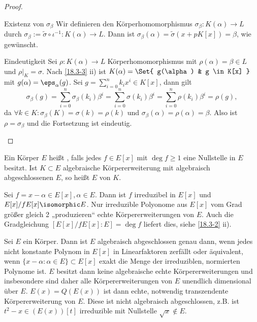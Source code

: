 \begin{st}
\begin{proof}
\begin{seg}{Existenz von $\sigma_\beta$}
			Wir definieren den Körperhomomorphismus $\sigma_\beta: K(\alpha) \to L$ durch $\sigma_\beta := \tilde \sigma \circ \iota^{-1}: K(\alpha) \to L$.
			Dann ist $\sigma_\beta(\alpha) = \tilde \sigma(x + pK[x]) = \beta$, wie gewünscht.
		\end{seg}
		\begin{seg}{Eindeutigkeit}
			Sei $\rho: K(\alpha) \to L$ Körperhomomorphismus mit $\rho(\alpha) = \beta \in L$ und $\rho|_K = \sigma$.
			Nach \ref{18.3-3} ii) ist $K(\alpha) = \Set{ g(\alpha) & g \in K[x] }$ mit $g(\alpha) = \eps_\alpha(g)$.
			Sei $g = \sum_{i=0}^n k_i x^i \in K[x]$, dann gilt
			\[
				\sigma_\beta(g)
				= \sum_{i=0}^n \sigma_\beta(k_i) \beta^i
				= \sum_{i=0}^n \sigma(k_i)\beta^i
				= \sum_{i=0}^n \rho(k_i) \beta^i
				= \rho(g),
			\]
			da $\forall k \in K: \sigma_\beta(K) = \sigma(k) = \rho(k)$ und $\sigma_\beta(\alpha) = \rho(\alpha) = \beta$.
			Also ist $\rho = \sigma_\beta$ und die Fortsetzung ist eindeutig.
		\end{seg}
	\end{proof}
\end{st}

\begin{df} \label{18.4-5}
	Ein Körper $E$ heißt , falls jedes $f \in E[x]$ mit $\deg f \ge 1$ eine Nullstelle in $E$ besitzt.
	Ist $K \subset E$ algebraische Körpererweiterung mit algebraisch abgeschlossenen $E$, so heißt $E$  von $K$.
\end{df}

\begin{note}
	Sei $f = x - \alpha \in E[x], \alpha \in E$.
	Dann ist $f$ irreduzibel in $E[x]$ und $E[x] / fE[x] \isomorphic E$.
	Nur irreduzible Polyonome aus $E[x]$ vom Grad größer gleich 2 „produzieren“ echte Körpererweiterungen von $E$.
	Auch die Gradgleichung $[E[x] / fE[x] : E] = \deg f$ liefert dies, siehe \ref{18.3-2} ii).
\end{note}

\begin{kor} \label{18.4-6}
	Sei $E$ ein Körper.
	Dann ist $E$ algebraisch abgeschlossen genau dann, wenn jedes nicht konstante Polynom in $E[x]$ in Linearfaktoren zerfällt oder äquivalent, wenn $\{x - \alpha : \alpha \in E\} \subset E[x]$ exakt die Menge der irreduziblen, normierten Polynome ist.
	$E$ besitzt dann keine algebraische echte Körpererweiterungen und insbesondere sind daher alle Körpererweiterungen von $E$ unendlich dimensional über $E$.
	$E(x) = Q(E(x))$ ist dann echte, notwendig transzendente Körpererweiterung von $E$.
	Diese ist nicht algebraisch abgeschlossen, z.B. ist $t^2 - x \in (E(x))[t]$ irreduzible mit Nullstelle $\sqrt x \not\in E$.
\end{kor}

